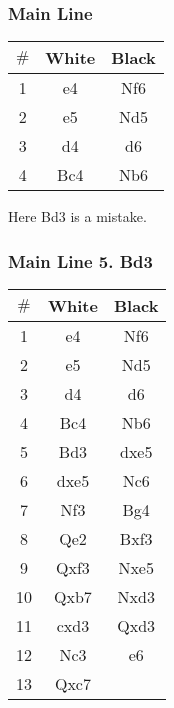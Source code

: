 \documentclass{article}
\newcommand{\smalls}{\par\smallskip}
\begin{document}
        \subsubsection*{Main Line}
        \begin{multicols}{2}
            \showboard
            \smalls
            \begin{tabular}{c|c|c}
                $\#$ & White & Black\\
                \hline
                1 & e4 & Nf6 \\
                2 & e5 & Nd5 \\
                3 & d4 & d6 \\
                4 & Bc4 & Nb6 \\
            \end{tabular}
        \end{multicols}
        Here Bd3 is a mistake.


        \subsubsection*{Main Line 5. Bd3}
        \begin{multicols}{2}
            \showboard
            \smalls
            \begin{tabular}{c|c|c}
                $\#$ & White & Black\\
                \hline
                1 & e4 & Nf6 \\
                2 & e5 & Nd5 \\
                3 & d4 & d6 \\
                4 & Bc4 & Nb6 \\
                5 & Bd3 & dxe5 \\
                6 & dxe5 & Nc6 \\
                7 & Nf3 & Bg4 \\
                8 & Qe2 & Bxf3 \\
                9 & Qxf3 & Nxe5 \\
                10 & Qxb7 & Nxd3 \\
                11 & cxd3 & Qxd3 \\
                12 & Nc3 & e6 \\
                13 & Qxc7 & \\
            \end{tabular}
        \end{multicols}
\end{document}
